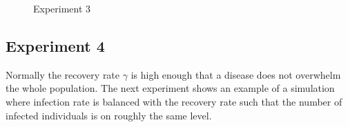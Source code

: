 \begin{figure}[H]
    \centering
    \hspace*{\fill}
    \hspace*{\fill}

    \caption{Experiment 3} \label{fig:experiment2}
\end{figure}

\subsection{Experiment 4}

Normally the recovery rate $\gamma$ is high enough that a disease does not overwhelm the whole population.
The next experiment shows an example of a simulation where infection rate is balanced with the recovery rate such that the number of infected individuals is on roughly the same level.


